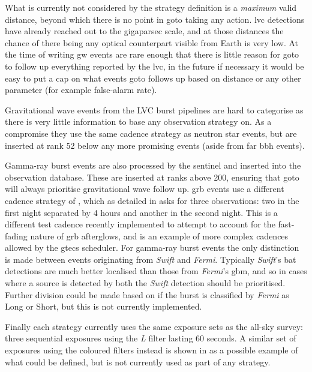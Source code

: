 \begin{colsection}
\begin{colsection}
What is currently not considered by the strategy definition is a \textit{maximum} valid distance, beyond which there is no point in \gls{goto} taking any action. \gls{lvc} detections have already reached out to the gigaparsec scale, and at those distances the chance of there being any optical counterpart visible from Earth is very low. At the time of writing \gls{gw} events are rare enough that there is little reason for \gls{goto} to follow up everything reported by the \gls{lvc}, in the future if necessary it would be easy to put a cap on what events \gls{goto} follows up based on distance or any other parameter (for example false-alarm rate).

Gravitational wave events from the LVC burst pipelines are hard to categorise as there is very little information to base any observation strategy on. As a compromise they use the same cadence strategy as neutron star events, but are inserted at rank 52 below any more promising events (aside from far \gls{bbh} events).

Gamma-ray burst events are also processed by the sentinel and inserted into the observation database. These are inserted at ranks above 200, ensuring that \gls{goto} will always prioritise gravitational wave follow up. \gls{grb} events use a different cadence strategy of , which as detailed in  asks for three observations: two in the first night separated by 4 hours and another in the second night. This is a different test cadence recently implemented to attempt to account for the fast-fading nature of \gls{grb} afterglows, and is an example of more complex cadences allowed by the \gls{gtecs} scheduler. For gamma-ray burst events the only distinction is made between events originating from \textit{Swift} and \textit{Fermi}. Typically \textit{Swift}'s \gls{bat} detections are much better localised than those from \textit{Fermi}'s \gls{gbm}, and so in cases where a source is detected by both the \textit{Swift} detection should be prioritised. Further division could be made based on if the burst is classified by \textit{Fermi} as Long or Short, but this is not currently implemented.

Finally each strategy currently uses the same exposure sets as the all-sky survey: three sequential exposures using the \textit{L} filter lasting 60 seconds. A similar set of exposures using the coloured filters instead is shown in  as a possible example of what could be defined, but is not currently used as part of any strategy.


\end{colsection}
\end{colsection}
